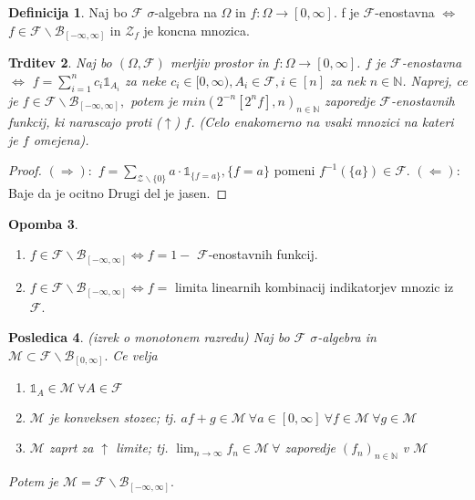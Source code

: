\documentclass[a4paper,12pt]{article}
\theoremstyle{definition} %
\newtheorem{definicija}{Definicija}[section]
\newtheorem{opomba}[definicija]{Opomba}
\theoremstyle{plain} %
\newtheorem{trditev}[definicija]{Trditev}
\newtheorem{posledica}[definicija]{Posledica}
\newcommand{\N}{\mathbb{N}}
\newcommand{\F}{\mathcal{F}}
\begin{document}
            \begin{definicija}
                Naj bo $\F$ $\sigma$-algebra na $\Omega$ in $f:\Omega\rightarrow [0, \infty]$.
                f je $\F$-enostavna $\iff$ $f \in \F\backslash\mathcal{B}_{[-\infty, \infty]}$ in $\mathcal{Z}_f$ je koncna mnozica.
            \end{definicija}

            \begin{trditev}
                Naj bo $(\Omega, \F)$ merljiv prostor in $f:\Omega\rightarrow [0, \infty]$. $f$ je $\F$-enostavna $\iff$
                $f = \sum_{i = 1}^{n}c_i\mathds{1}_{A_i}$ za neke $c_i \in [0, \infty), A_i \in \F, i \in [n]$ za nek $n \in \N$. Naprej, ce je $f \in \F\backslash\mathcal{B}_{[-\infty, \infty]},$
                potem je $min\left(2^{-n}[2^nf], n\right)_{n \in \N}$ zaporedje $\F$-enostavnih funkcij, ki narascajo proti ($\uparrow$) $f$. (Celo enakomerno na vsaki mnozici na kateri je $f$ omejena).
            \end{trditev}

            \begin{proof}
                $(\Rightarrow):$ $f = \sum_{\mathcal{Z}\backslash\{0\}}a\cdot\mathds{1}_{\{f = a\}}, \{f = a\}$ pomeni $f^{-1}(\{a\}) \in \F.$
                $(\Leftarrow):$ Baje da je ocitno
                Drugi del je jasen.
            \end{proof}

            \begin{opomba}
                \begin{enumerate}
                    \item $f \in \F\backslash\mathcal{B}_{[-\infty, \infty]} \iff f = 1 -$ $\F$-enostavnih funkcij.
                    \item $f \in \F\backslash\mathcal{B}_{[-\infty, \infty]} \iff f =$ limita linearnih kombinacij indikatorjev mnozic iz $\F$.
                \end{enumerate}

            \end{opomba}

            \begin{posledica}(izrek o monotonem razredu)
                Naj bo $\F$ $\sigma$-algebra in $\mathcal{M} \subset \F\backslash\mathcal{B}_{[0, \infty]}.$ Ce velja
                \begin{enumerate}
                    \item $\mathds{1}_A \in \mathcal{M} \ \forall A \in \F$
                    \item $\mathcal{M}$ je konveksen stozec; tj. $af + g \in \mathcal{M} \ \forall a \in [0, \infty] \ \forall f \in \mathcal{M} \ \forall g \in \mathcal{M}$
                    \item $\mathcal{M}$ zaprt za $\uparrow$ limite; tj. $\lim_{n \rightarrow \infty}f_n \in \mathcal{M} \ \forall$ zaporedje $(f_n)_{n \in \N} $ v $\mathcal{M}$
                \end{enumerate}
                Potem je $\mathcal{M} =  \F\backslash\mathcal{B}_{[-\infty, \infty]}.$
            \end{posledica}
\end{document}
